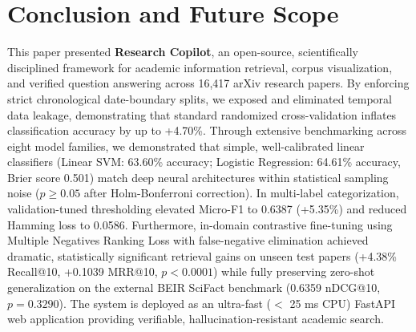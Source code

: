 \documentclass[journal]{IEEEtran}
\begin{document}
\section{Conclusion and Future Scope}
This paper presented \textbf{Research Copilot}, an open-source, scientifically disciplined framework for academic information retrieval, corpus visualization, and verified question answering across 16,417 arXiv research papers. By enforcing strict chronological date-boundary splits, we exposed and eliminated temporal data leakage, demonstrating that standard randomized cross-validation inflates classification accuracy by up to +4.70\%. Through extensive benchmarking across eight model families, we demonstrated that simple, well-calibrated linear classifiers (Linear SVM: 63.60\% accuracy; Logistic Regression: 64.61\% accuracy, Brier score 0.501) match deep neural architectures within statistical sampling noise ($p \ge 0.05$ after Holm-Bonferroni correction). In multi-label categorization, validation-tuned thresholding elevated Micro-F1 to 0.6387 (+5.35\%) and reduced Hamming loss to 0.0586. Furthermore, in-domain contrastive fine-tuning using Multiple Negatives Ranking Loss with false-negative elimination achieved dramatic, statistically significant retrieval gains on unseen test papers (+4.38\% Recall@10, +0.1039 MRR@10, $p < 0.0001$) while fully preserving zero-shot generalization on the external BEIR SciFact benchmark (0.6359 nDCG@10, $p = 0.3290$). The system is deployed as an ultra-fast ($<$ 25 ms CPU) FastAPI web application providing verifiable, hallucination-resistant academic search.
\end{document}
